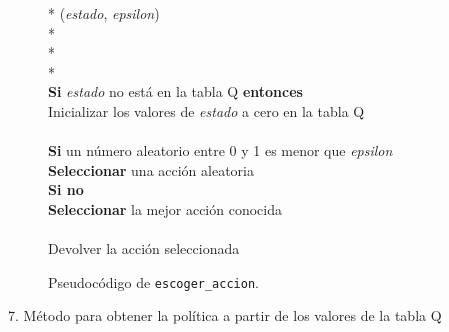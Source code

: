\documentclass[conference,a4paper]{IEEEtran}
\begin{document}
\begin{figure}[h]
  \begin{pseudo}*
    (\textit{estado}, \textit{epsilon}) \\*
     \\*
     \\*
    \\
    \textbf{Si} \textit{estado} no está en la tabla Q \textbf{entonces} \\
    \> Inicializar los valores de \textit{estado} a cero en la tabla Q \\
    \\
    \textbf{Si} un número aleatorio entre 0 y 1 es menor que \textit{epsilon}\\
    \> \textbf{Seleccionar} una acción aleatoria \\
    \textbf{Si no} \\
    \> \textbf{Seleccionar} la mejor acción conocida \\
    \\
    Devolver la acción seleccionada
  \end{pseudo}
  \caption{Pseudocódigo de \texttt{escoger\_accion}.}
  \label{fig:escoger_accion}
\end{figure}

7. Método para obtener la política a partir de los valores de la tabla Q\newline\newline\newline\newline\newline\newline\newline\newline
\end{document}

